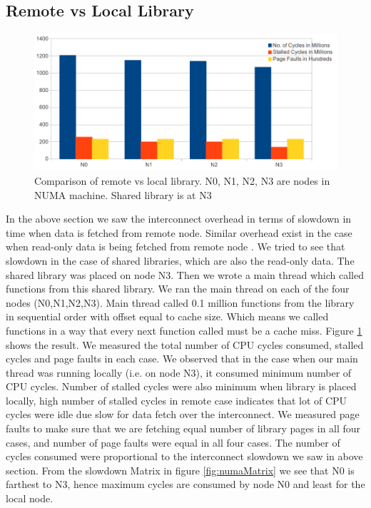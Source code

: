 \subsection{Remote vs Local Library} \label{sec:remoteVsLocal}

\begin{figure}
    \centering
    \includegraphics[scale=0.38]{remoteVsLocal.png}
    \caption{Comparison of remote vs local library. N0, N1, N2, N3 are nodes in NUMA machine. Shared library is at N3 }
    \label{fig:remoteVsLocal}
\end{figure}


In the above section we saw the interconnect overhead in terms of slowdown in time when data is fetched from remote node.
Similar overhead exist in the case when read-only data is being fetched from remote node \cite{Drepper07whatevery}.
We tried to see that slowdown in the case of shared libraries, which are also the read-only data.
The shared library was placed on node N3.
Then we wrote a main thread which called functions from this shared library.
We ran the main thread on each of the four nodes (N0,N1,N2,N3).
Main thread called 0.1 million functions from the library in sequential order with offset equal to cache size.
Which means we called functions in a way that every next function called must be a cache miss.
Figure \ref{fig:remoteVsLocal} shows the result.
We measured the total number of CPU cycles consumed, stalled cycles and page faults in each case.
We observed that in the case when our main thread was running locally (i.e. on node N3), it consumed minimum number of CPU cycles.
Number of stalled cycles were also minimum when library is placed locally, high number of stalled cycles in remote case indicates that lot of CPU cycles were idle due slow for data fetch over the interconnect.
We measured page faults to make sure that we are fetching equal number of library pages in all four cases, and number of page faults were equal in all four cases.
The number of cycles consumed were proportional to the interconnect slowdown we saw in above section.
From the slowdown Matrix in figure \ref{fig:numaMatrix} we see that N0 is farthest to N3, hence maximum cycles are consumed by node N0 and least for the local node.



